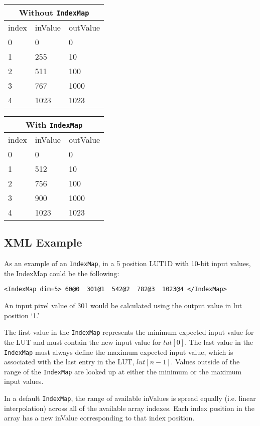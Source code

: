 \begin{center}
\begin{tabularx}{2in}{|X|X|X|}
\hline
\multicolumn{3}{|c|}{Without \texttt{IndexMap}} \\\hline
index & inValue & outValue \\\hline
0 & 0 & 0 \\\hline
1 & 255	& 10 \\\hline
2 & 511	& 100 \\\hline
3 & 767	& 1000 \\\hline
4 & 1023 &1023 \\\hline
\end{tabularx}
\quad
\begin{tabularx}{2in}{|X|X|X|}
\hline
\multicolumn{3}{|c|}{With \texttt{IndexMap}} \\\hline
index & inValue & outValue \\\hline
0 & 0 & 0 \\\hline
1 & 512 & 10 \\\hline
2 & 756 & 100 \\\hline
3 & 900 & 1000 \\\hline
4 & 1023 & 1023 \\\hline
\end{tabularx}
\end{center}


\subsection*{XML Example}
As an example of an \texttt{IndexMap}, in a 5 position LUT1D with 10-bit input values, the IndexMap could be the following:

\lstinline!<IndexMap dim=5> 60@0  301@1  542@2  782@3  1023@4 </IndexMap>!

An input pixel value of 301 would be calculated using the output value in lut position `1.' 

The first value in the \texttt{IndexMap} represents the minimum expected input value for the LUT and must contain the new input value for $lut[0]$. The last value in the \texttt{IndexMap} must always define the maximum expected input value, which is associated with the last entry in the LUT, $lut[n-1]$.  Values outside of the range of the \texttt{IndexMap} are looked up at either the minimum or the maximum input values.

In a default \texttt{IndexMap}, the range of available inValues is spread equally (i.e. linear interpolation) across all of the available array indexes.  Each index position in the array has a new inValue corresponding to that index position. 

